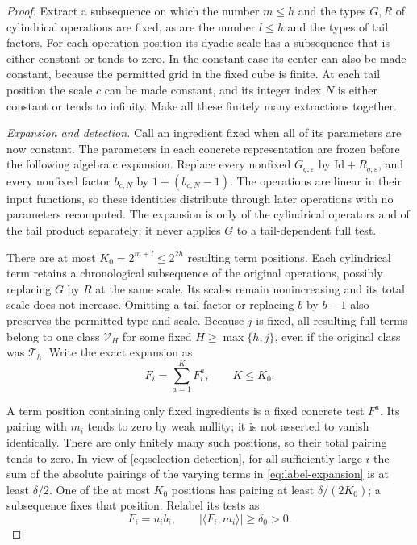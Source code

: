 \begin{proof}
Extract a subsequence on which the number \(m\leq h\)
and the types \(G,R\) of cylindrical operations are fixed, as are
the number \(l\leq h\) and the types of tail factors. For each
operation position its dyadic scale has a subsequence that is either
constant or tends to zero. In the constant case its center can also
be made constant, because the permitted grid in the fixed cube is
finite. At each tail position the scale \(c\) can be made constant,
and its integer index \(N\) is either constant or tends to infinity.
Make all these finitely many extractions together.

\emph{Expansion and detection.}
Call an ingredient fixed when all of its parameters are now constant.
The parameters in each concrete representation are frozen before
the following algebraic expansion. Replace every nonfixed
\(G_{q,\varepsilon}\) by
\(\mathrm{Id}+R_{q,\varepsilon}\), and every nonfixed factor
\(b_{c,N}\) by \(1+(b_{c,N}-1)\). The operations are linear in their
input functions, so these identities distribute through later
operations with no parameters recomputed. The expansion is only of
the cylindrical operators and of the tail product separately; it
never applies \(G\) to a tail-dependent full test.

There are at most \(K_0=2^{m+l}\leq2^{2h}\) resulting term positions.
Each cylindrical term retains a chronological subsequence of the
original operations, possibly replacing \(G\) by \(R\) at the same
scale. Its scales remain nonincreasing and its total scale does not
increase. Omitting a tail factor or replacing \(b\) by \(b-1\)
also preserves the permitted type and scale. Because \(j\) is fixed,
all resulting full terms belong to one class \(\mathcal V_H\) for
some fixed \(H\geq\max\{h,j\}\), even if the original class was
\(\mathcal T_h\). Write the exact expansion as
\begin{equation}
                             F_i=\sum_{a=1}^{K}F_i^a,
                 \qquad K\leq K_0.                          \label{eq:label-expansion}
\end{equation}

A term position containing only fixed ingredients is a fixed concrete
test \(F^a\). Its pairing with \(m_i\) tends to zero by
weak nullity; it is not asserted to vanish identically.
There are only finitely many such positions, so their total pairing
tends to zero. In view of \eqref{eq:selection-detection}, for all sufficiently large \(i\)
the sum of the absolute pairings of the varying terms in \eqref{eq:label-expansion} is
at least \(\delta/2\). One of the at most \(K_0\) positions has
pairing at least \(\delta/(2K_0)\); a subsequence fixes that position.
Relabel its tests as
\begin{equation}
              F_i=u_i b_i,\qquad
              |\langle F_i,m_i\rangle|\geq\delta_0>0.       \label{eq:varying-detection}
\end{equation}


\end{proof}
